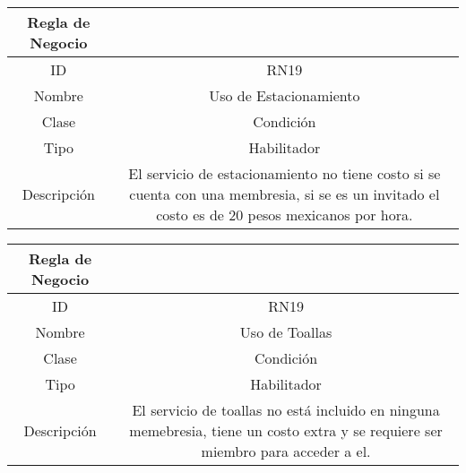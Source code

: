 \documentclass{article}
\begin{document}
\begin{center}
\begin{tabular}{ |c|c| } 
 \hline
 Regla de Negocio & \\
 \hline
 ID & RN19 \\ 
  \hline
  Nombre & Uso de Estacionamiento\\ 
  \hline
  Clase & Condición\\ 
  \hline
  Tipo & Habilitador\\ 
  \hline
  Descripción & El servicio de estacionamiento no tiene costo si se cuenta con una membresia, si se es un invitado el costo es de 20 pesos mexicanos por hora.\\ 
   \hline
 \hline
\end{tabular}
\end{center}

\begin{center}
\begin{tabular}{ |c|c| } 
 \hline
 Regla de Negocio & \\
 \hline
 ID & RN19 \\ 
  \hline
  Nombre & Uso de Toallas\\ 
  \hline
  Clase & Condición\\ 
  \hline
  Tipo & Habilitador\\ 
  \hline
  Descripción & El servicio de toallas no está incluido en ninguna memebresia, tiene un costo extra y se requiere ser miembro para acceder a el.\\ 
   \hline
 \hline
\end{tabular}
\end{center}
\end{document}
